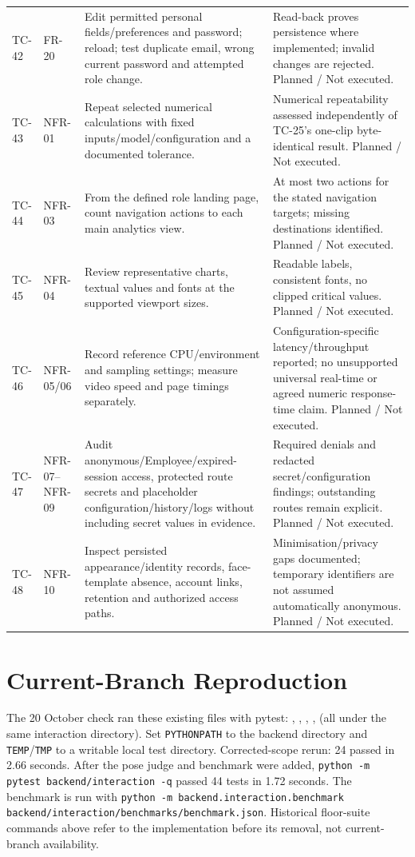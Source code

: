 \begin{longtable}{P{0.08\textwidth}P{0.13\textwidth}P{0.35\textwidth}P{0.34\textwidth}}
TC-42 & FR-20 & Edit permitted personal fields/preferences and password; reload; test duplicate email, wrong current password and attempted role change. & Read-back proves persistence where implemented; invalid changes are rejected. Planned / Not executed.\\
TC-43 & NFR-01 & Repeat selected numerical calculations with fixed inputs/model/configuration and a documented tolerance. & Numerical repeatability assessed independently of TC-25's one-clip byte-identical result. Planned / Not executed.\\
TC-44 & NFR-03 & From the defined role landing page, count navigation actions to each main analytics view. & At most two actions for the stated navigation targets; missing destinations identified. Planned / Not executed.\\
TC-45 & NFR-04 & Review representative charts, textual values and fonts at the supported viewport sizes. & Readable labels, consistent fonts, no clipped critical values. Planned / Not executed.\\
TC-46 & NFR-05/06 & Record reference CPU/environment and sampling settings; measure video speed and page timings separately. & Configuration-specific latency/throughput reported; no unsupported universal real-time or agreed numeric response-time claim. Planned / Not executed.\\
TC-47 & NFR-07--NFR-09 & Audit anonymous/Employee/expired-session access, protected route secrets and placeholder configuration/history/logs without including secret values in evidence. & Required denials and redacted secret/configuration findings; outstanding routes remain explicit. Planned / Not executed.\\
TC-48 & NFR-10 & Inspect persisted appearance/identity records, face-template absence, account links, retention and authorized access paths. & Minimisation/privacy gaps documented; temporary identifiers are not assumed automatically anonymous. Planned / Not executed.\\
\bottomrule
\end{longtable}

\section{Current-Branch Reproduction}
The 20 October check ran these existing files with pytest: , , , ,  (all under the same interaction directory). Set \texttt{PYTHONPATH} to the backend directory and \texttt{TEMP}/\texttt{TMP} to a writable local test directory. Corrected-scope rerun: 24 passed in 2.66 seconds. After the pose judge and benchmark were added, \texttt{python -m pytest backend/interaction -q} passed 44 tests in 1.72 seconds. The benchmark is run with \texttt{python -m backend.interaction.benchmark backend/interaction/benchmarks/benchmark.json}. Historical floor-suite commands above refer to the implementation before its removal, not current-branch availability.
